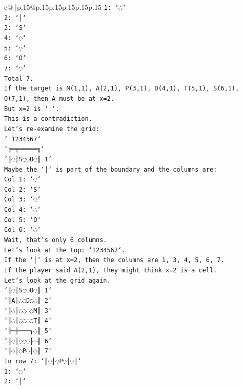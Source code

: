 \documentclass{article}
\begin{document}
{\begin{supertabular}{c@{$\;$}|p{.15\linewidth}@{}p{.15\linewidth}p{.15\linewidth}p{.15\linewidth}p{.15\linewidth}p{.15\linewidth}}
{{{\texttt{1: `◌`} \\
\texttt{2: `│`} \\
\texttt{3: `S`} \\
\texttt{4: `◌`} \\
\texttt{5: `◌`} \\
\texttt{6: `O`} \\
\texttt{7: `◌`} \\
\texttt{Total 7.} \\
\texttt{If the target is M(1,1), A(2,1), P(3,1), D(4,1), T(5,1), S(6,1), O(7,1), then A must be at x=2.} \\
\texttt{But x=2 is `│`.} \\
\texttt{This is a contradiction.} \\
\texttt{Let's re{-}examine the grid:} \\
\texttt{` 1234567`} \\
\texttt{`╔═╤═════╗`} \\
\texttt{`║◌│S◌◌O◌║ 1`} \\
\texttt{Maybe the `│` is part of the boundary and the columns are:} \\
\texttt{Col 1: `◌`} \\
\texttt{Col 2: `S`} \\
\texttt{Col 3: `◌`} \\
\texttt{Col 4: `◌`} \\
\texttt{Col 5: `O`} \\
\texttt{Col 6: `◌`} \\
\texttt{Wait, that's only 6 columns.} \\
\texttt{Let's look at the top: `1234567`.} \\
\texttt{If the `│` is at x=2, then the columns are 1, 3, 4, 5, 6, 7.} \\
\texttt{If the player said A(2,1), they might think x=2 is a cell.} \\
\texttt{Let's look at the grid again.} \\
\texttt{`║◌│S◌◌O◌║ 1`} \\
\texttt{`║A│◌◌D◌◌║ 2`} \\
\texttt{`║◌│◌◌◌◌M║ 3`} \\
\texttt{`║◌│◌◌◌◌T║ 4`} \\
\texttt{`╟─┼───┐◌║ 5`} \\
\texttt{`║◌│◌◌◌├─╢ 6`} \\
\texttt{`║◌│◌P◌│◌║ 7`} \\
\texttt{In row 7: `║◌│◌P◌│◌║`} \\
\texttt{1: `◌`} \\
\texttt{2: `│`} \\
}}}
\end{supertabular}}
\end{document}

